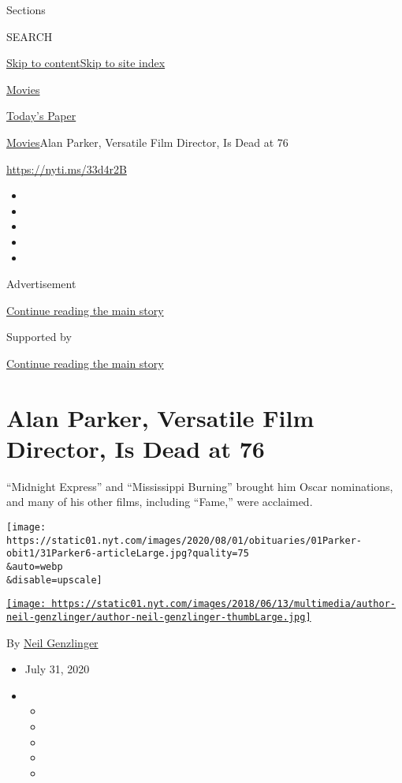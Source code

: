 Sections

SEARCH

\protect\hyperlink{site-content}{Skip to
content}\protect\hyperlink{site-index}{Skip to site index}

\href{https://www.nytimes.com/section/movies}{Movies}

\href{https://myaccount.nytimes.com/auth/login?response_type=cookie\&client_id=vi}{}

\href{https://www.nytimes.com/section/todayspaper}{Today's Paper}

\href{/section/movies}{Movies}\textbar{}Alan Parker, Versatile Film
Director, Is Dead at 76

\url{https://nyti.ms/33d4r2B}

\begin{itemize}
\item
\item
\item
\item
\item
\end{itemize}

Advertisement

\protect\hyperlink{after-top}{Continue reading the main story}

Supported by

\protect\hyperlink{after-sponsor}{Continue reading the main story}

\hypertarget{alan-parker-versatile-film-director-is-dead-at-76}{%
\section{Alan Parker, Versatile Film Director, Is Dead at
76}\label{alan-parker-versatile-film-director-is-dead-at-76}}

``Midnight Express'' and ``Mississippi Burning'' brought him Oscar
nominations, and many of his other films, including ``Fame,'' were
acclaimed.

\texttt{[image: https://static01.nyt.com/images/2020/08/01/obituaries/01Parker-obit1/31Parker6-articleLarge.jpg?quality=75\\\&auto=webp\\\&disable=upscale]}

\href{https://www.nytimes.com/by/neil-genzlinger}{\texttt{[image: https://static01.nyt.com/images/2018/06/13/multimedia/author-neil-genzlinger/author-neil-genzlinger-thumbLarge.jpg]}}

By \href{https://www.nytimes.com/by/neil-genzlinger}{Neil Genzlinger}

\begin{itemize}
\item
  July 31, 2020
\item
  \begin{itemize}
  \item
  \item
  \item
  \item
  \item
  \end{itemize}
\end{itemize}

